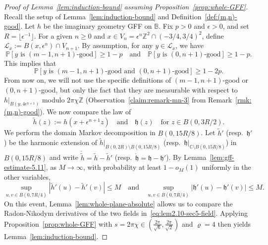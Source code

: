\documentclass[a4paper]{article}
\numberwithin{equation}{section}
\numberwithin{equation}{section}
\renewcommand{\1}{\mathbf{1}}
\begin{document}
\begin{proof}[Proof of Lemma~\ref{lem:induction-bound} assuming Proposition~\ref{prop:whole-GFF}]
    Recall the setup of Lemma~\ref{lem:induction-bound} and Definition~\ref{def:(m,n)-good}. Let $h$ be the imaginary geometry GFF on $\mathbb{B}$. Fix $p>0$ and $\epsilon>0$, and set $R = \lfloor \epsilon^{-1} \rfloor$. For a given $n \geq 0$ and $x \in V_{n} = \epsilon^{n}\mathbb{Z}^2 \cap (-3/4,3/4)^2$, define $\mathcal L_x := B(x, \epsilon^{n}) \cap V_{n+1}$. By assumption, for any $y \in \mathcal L_x$, we have
    $$
    \mathbb{P}[y \mbox{ is } (m-1,n+1) \mbox{-good}] \geq 1-p \quad \mbox{and} \quad \mathbb{P}[y \mbox{ is } (0,n+1) \mbox{-good}] \geq 1-p.
    $$
    This implies that
    \begin{equation}\label{eq:lem2.10-sec5-bound}
        \mathbb{P}[y \mbox{ is } (m-1,n+1) \mbox{-good and } (0,n+1) \mbox{-good}] \geq 1-2p.
    \end{equation}
    From now on, we will not use the specific definitions of $(m-1,n+1)$-good or $(0,n+1)$-good, but only the fact that they are measurable with respect to $h|_{B(y, 4 \epsilon^{n+1})}$ modulo $2 \pi \chi \mathbb{Z}$ (Observation~\eqref{claim:remark-mn-3} from Remark~\ref{rmk:(m,n)-good}). We now compare the law of
    \begin{equation}\label{eq:lem2.10-sec5-field}
        \widetilde h(z):=h(x + \epsilon^{n+1} z) \quad \mbox{and} \quad \mathfrak h (z) \quad \mbox{for } z \in B(0,3R/2).
    \end{equation}
    We perform the domain Markov decomposition in $B(0,15R/8)$. Let $\widetilde h'$ (resp.\ $\mathfrak h'$) be the harmonic extension of $\widetilde h|_{B(0,2R) \setminus B(0,15R/8)}$ (resp.\ $\mathfrak h|_{\mathbb{C} \setminus B(0,15R/8)}$) in $B(0,15R/8)$ and write $\mathring{\widetilde h} = \widetilde h - \widetilde h'$ (resp.\ $\mathring{\mathfrak h} = \mathfrak h - \mathfrak h'$). By Lemma~\ref{lem:gff-estimate-5.11}, as $M \to \infty$, with probability at least $1- o_M(1)$ uniformly in the other variables,
    $$
    \sup_{u,v \in B(0,7R/4)}| \widetilde h'(u) - \widetilde h'(v)| \leq M \quad \mbox{and} \quad \sup_{u,v \in B(0,7R/4)}| \mathfrak h'(u) - \mathfrak h'(v)| \leq M.
    $$
    On this event, Lemma~\ref{lem:whole-plane-absolute} allows us to compare the Radon-Nikodym derivatives of the two fields in~\eqref{eq:lem2.10-sec5-field}. Applying Proposition~\ref{prop:whole-GFF} with $s = 2 \pi \chi \in (\frac{2\pi}{\sqrt{6}},\frac{2\pi}{\sqrt{2}})$ and $\varrho = 4$ then yields Lemma~\ref{lem:induction-bound}.
    

\end{proof}
\end{document}
